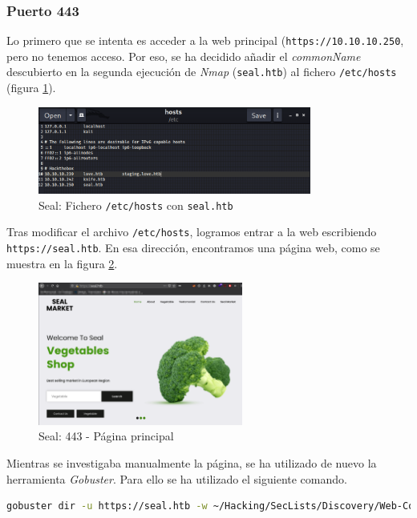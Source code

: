 \subsubsection{Puerto 443}

Lo primero que se intenta es acceder a la web principal (\texttt{https://10.10.10.250}, pero no tenemos acceso. Por eso, se ha decidido añadir el \textit{commonName} descubierto en la segunda ejecución de \textit{Nmap} (\texttt{seal.htb}) al fichero \texttt{/etc/hosts} (figura \ref{fig:seal-etc-hosts}).

\begin{figure}[h]
    \centering
    \includegraphics[width=0.80\textwidth]{images/machines/seal/etc-hosts.png}
    \caption{Seal: Fichero \texttt{/etc/hosts} con \texttt{seal.htb}}
    \label{fig:seal-etc-hosts}
\end{figure}

Tras modificar el archivo \texttt{/etc/hosts}, logramos entrar a la web escribiendo \texttt{\\https://seal.htb}. En esa dirección, encontramos una página web, como se muestra en la figura \ref{fig:seal-443-main}.

\begin{figure}[h]
    \centering
    \includegraphics[width=0.60\textwidth]{images/machines/seal/seal-main.png}
    \caption{Seal: 443 - Página principal}
    \label{fig:seal-443-main}
\end{figure}

Mientras se investigaba manualmente la página, se ha utilizado de nuevo la herramienta \textit{Gobuster}\cite{gobuster}. Para ello se ha utilizado el siguiente comando.
\begin{lstlisting}[language=bash]
gobuster dir -u https://seal.htb -w ~/Hacking/SecLists/Discovery/Web-Content/tomcat.txt -k | anew 03_gobuster_433.txt
\end{lstlisting}

